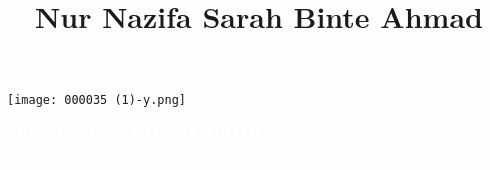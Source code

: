 \documentclass[11pt,oneside,a4paper,titlepage]{article}
\title{Nur Nazifa Sarah Binte Ahmad}
\date{}
\begin{document}
\begin{tcolorbox}
\begin{minipage}{4.5cm}
\hspace*{0.3cm}\texttt{[image: 000035 (1)-y.png]}
\end{minipage}
\begin{minipage}{15cm}
\begin{center}
    \Huge{\textcolor{white}{NUR NAZIFA SARAH BINTE AHMAD}}\\
    \vspace{0.5cm}
    \Large{\textcolor{white}{\textit{Student | Information Technology}}}
\end{center}
\end{minipage}
\end{tcolorbox}
\end{document}
